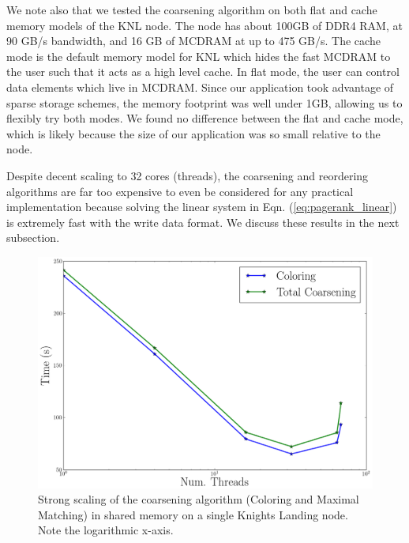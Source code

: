 \documentclass[11pt]{article}
\begin{document}
We note also that we tested the coarsening algorithm on both flat and cache
memory models of the KNL node. The node has about 100GB of DDR4 RAM, at 90 GB/s
bandwidth, and 16 GB of MCDRAM at up to 475 GB/s. The cache mode is the default
memory model for KNL which hides the fast MCDRAM to the user such that it acts
as a high level cache. In flat mode, the user can control data elements which
live in MCDRAM. Since our application took advantage of sparse storage schemes,
the memory footprint was well under 1GB, allowing us to flexibly try both modes.
We found no difference between the flat and cache mode, which is likely because
the size of our application was so small relative to the node.

Despite decent scaling to 32 cores (threads), the coarsening and reordering
algorithms are far
too expensive to even be considered for any practical implementation because
solving the linear system in Eqn. (\ref{eq:pagerank_linear}) is extremely fast
with the write data format. We discuss these results in the next subsection.



\begin{figure}
\centering
\includegraphics[width=.5\linewidth]{figs/color_timing.png}
\caption{Strong scaling of the coarsening algorithm (Coloring and Maximal
Matching) in shared memory on a single Knights Landing node. Note the
logarithmic x-axis.}
\label{fig:color_time}
\end{figure}



\newpage



 

\end{document}
